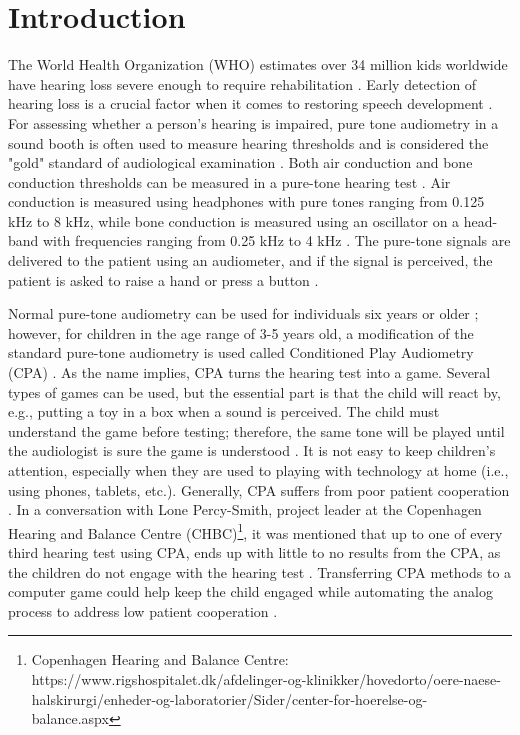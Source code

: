 \section{Introduction} \label{introduction}
The World Health Organization (WHO) estimates over 34 million kids worldwide have hearing loss severe enough to require rehabilitation \cite{WHO}. Early detection of hearing loss is a crucial factor when it comes to restoring speech development \cite{ipadAudiometry, self-administeredHL, warbleTonesComparison}. For assessing whether a person's hearing is impaired, pure tone audiometry in a sound booth is often used to measure hearing thresholds \cite{self-administeredHL} and is considered the "gold" standard of audiological examination \cite{GoldStandard}. Both air conduction and bone conduction thresholds can be measured in a pure-tone hearing test \cite{GoldStandard}. Air conduction is measured using headphones with pure tones ranging from 0.125 kHz to 8 kHz, while bone conduction is measured using an oscillator on a head-band with frequencies ranging from 0.25 kHz to 4 kHz \cite{GoldStandard}. The pure-tone signals are delivered to the patient using an audiometer, and if the signal is perceived, the patient is asked to raise a hand or press a button \cite{RaiseHand}.  \newline

Normal pure-tone audiometry can be used for individuals six years or older \cite{CFBH}; however, for children in the age range of 3-5 years old, a modification of the standard pure-tone audiometry is used called Conditioned Play Audiometry (CPA) \cite{CFBH}. As the name implies, CPA turns the hearing test into a game. Several types of games can be used, but the essential part is that the child will react by, e.g., putting a toy in a box when a sound is perceived. The child must understand the game before testing; therefore, the same tone will be played until the audiologist is sure the game is understood \cite{CFBH}. It is not easy to keep children's attention, especially when they are used to playing with technology at home (i.e., using phones, tablets, etc.). Generally, CPA suffers from poor patient cooperation \cite{ipadAudiometry}. In a conversation with Lone Percy-Smith, project leader at the Copenhagen Hearing and Balance Centre (CHBC)\footnote{Copenhagen Hearing and Balance Centre: https://www.rigshospitalet.dk/afdelinger-og-klinikker/hovedorto/oere-naese-halskirurgi/enheder-og-laboratorier/Sider/center-for-hoerelse-og-balance.aspx}, it was mentioned that up to one of every third hearing test using CPA, ends up with little to no results from the CPA, as the children do not engage with the hearing test \cite{loneConversation}.  Transferring CPA methods to a computer game could help keep the child engaged while automating the analog process to address low patient cooperation \cite{ipadAudiometry}. \newline

